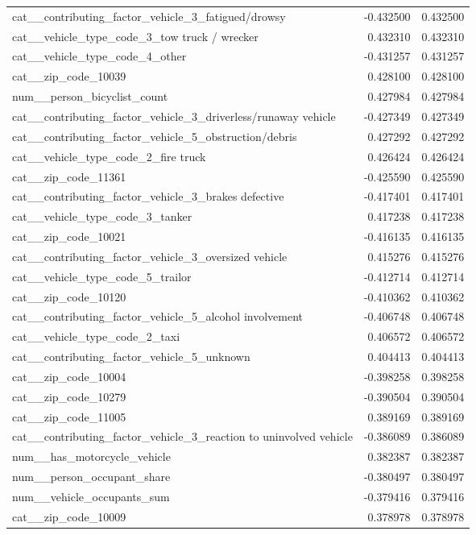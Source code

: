 \begin{tabular}{lrr}
cat__contributing_factor_vehicle_3_fatigued/drowsy & -0.432500 & 0.432500 \\
cat__vehicle_type_code_3_tow truck / wrecker & 0.432310 & 0.432310 \\
cat__vehicle_type_code_4_other & -0.431257 & 0.431257 \\
cat__zip_code_10039 & 0.428100 & 0.428100 \\
num__person_bicyclist_count & 0.427984 & 0.427984 \\
cat__contributing_factor_vehicle_3_driverless/runaway vehicle & -0.427349 & 0.427349 \\
cat__contributing_factor_vehicle_5_obstruction/debris & 0.427292 & 0.427292 \\
cat__vehicle_type_code_2_fire truck & 0.426424 & 0.426424 \\
cat__zip_code_11361 & -0.425590 & 0.425590 \\
cat__contributing_factor_vehicle_3_brakes defective & -0.417401 & 0.417401 \\
cat__vehicle_type_code_3_tanker & 0.417238 & 0.417238 \\
cat__zip_code_10021 & -0.416135 & 0.416135 \\
cat__contributing_factor_vehicle_3_oversized vehicle & 0.415276 & 0.415276 \\
cat__vehicle_type_code_5_trailor & -0.412714 & 0.412714 \\
cat__zip_code_10120 & -0.410362 & 0.410362 \\
cat__contributing_factor_vehicle_5_alcohol involvement & -0.406748 & 0.406748 \\
cat__vehicle_type_code_2_taxi & 0.406572 & 0.406572 \\
cat__contributing_factor_vehicle_5_unknown & 0.404413 & 0.404413 \\
cat__zip_code_10004 & -0.398258 & 0.398258 \\
cat__zip_code_10279 & -0.390504 & 0.390504 \\
cat__zip_code_11005 & 0.389169 & 0.389169 \\
cat__contributing_factor_vehicle_3_reaction to uninvolved vehicle & -0.386089 & 0.386089 \\
num__has_motorcycle_vehicle & 0.382387 & 0.382387 \\
num__person_occupant_share & -0.380497 & 0.380497 \\
num__vehicle_occupants_sum & -0.379416 & 0.379416 \\
cat__zip_code_10009 & 0.378978 & 0.378978 \\

\end{tabular}
